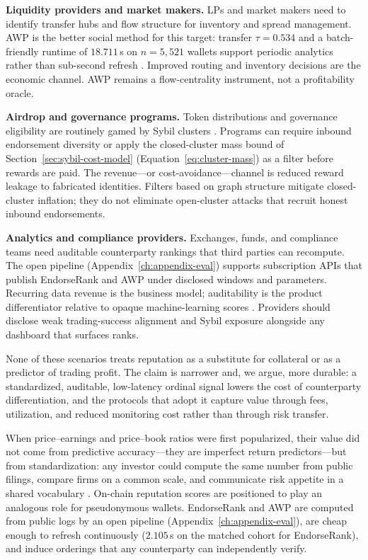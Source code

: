 \textbf{Liquidity providers and market makers.} LPs and market makers need to identify transfer hubs and flow structure for inventory and spread management. AWP is the better social method for this target: transfer $\tau=0.534$ and a batch-friendly runtime of $18.711$\,s on $n=5{,}521$ wallets support periodic analytics rather than sub-second refresh . Improved routing and inventory decisions are the economic channel. AWP remains a flow-centrality instrument, not a profitability oracle.

\textbf{Airdrop and governance programs.} Token distributions and governance eligibility are routinely gamed by Sybil clusters . Programs can require inbound endorsement diversity or apply the closed-cluster mass bound of Section~\ref{sec:sybil-cost-model} (Equation~\ref{eq:cluster-mass}) as a filter before rewards are paid. The revenue---or cost-avoidance---channel is reduced reward leakage to fabricated identities. Filters based on graph structure mitigate closed-cluster inflation; they do not eliminate open-cluster attacks that recruit honest inbound endorsements.

\textbf{Analytics and compliance providers.} Exchanges, funds, and compliance teams need auditable counterparty rankings that third parties can recompute. The open pipeline (Appendix~\ref{ch:appendix-eval}) supports subscription APIs that publish EndorseRank and AWP under disclosed windows and parameters. Recurring data revenue is the business model; auditability is the product differentiator relative to opaque machine-learning scores . Providers should disclose weak trading-success alignment and Sybil exposure alongside any dashboard that surfaces ranks.

None of these scenarios treats reputation as a substitute for collateral or as a predictor of trading profit. The claim is narrower and, we argue, more durable: a standardized, auditable, low-latency ordinal signal lowers the cost of counterparty differentiation, and the protocols that adopt it capture value through fees, utilization, and reduced monitoring cost rather than through risk transfer.


When price--earnings and price--book ratios were first popularized, their value did not come from predictive accuracy---they are imperfect return predictors---but from standardization: any investor could compute the same number from public filings, compare firms on a common scale, and communicate risk appetite in a shared vocabulary . On-chain reputation scores are positioned to play an analogous role for pseudonymous wallets. EndorseRank and AWP are computed from public logs by an open pipeline (Appendix~\ref{ch:appendix-eval}), are cheap enough to refresh continuously ($2.105$\,s on the matched cohort for EndorseRank), and induce orderings that any counterparty can independently verify.

